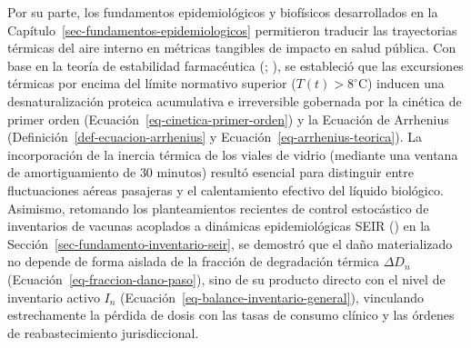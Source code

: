 \documentclass[
  spanish,
  letterpaper,
  DIV=11,
  numbers=noendperiod]{scrreprt}
\theoremstyle{plain}
\theoremstyle{plain}
\theoremstyle{plain}
\theoremstyle{definition}
\theoremstyle{remark}
\begin{document}
Por su parte, los fundamentos epidemiológicos y biofísicos desarrollados
en la Capítulo~\ref{sec-fundamentos-epidemiologicos} permitieron
traducir las trayectorias térmicas del aire interno en métricas
tangibles de impacto en salud pública. Con base en la teoría de
estabilidad farmacéutica (; ), se estableció que las excursiones térmicas por encima del
límite normativo superior (\(T(t) > 8^\circ\text{C}\)) inducen una
desnaturalización proteica acumulativa e irreversible gobernada por la
cinética de primer orden (Ecuación~\ref{eq-cinetica-primer-orden}) y la
Ecuación de Arrhenius (Definición~\ref{def-ecuacion-arrhenius} y
Ecuación~\ref{eq-arrhenius-teorica}). La incorporación de la inercia
térmica de los viales de vidrio (mediante una ventana de amortiguamiento
de \(30\text{ minutos}\)) resultó esencial para distinguir entre
fluctuaciones aéreas pasajeras y el calentamiento efectivo del líquido
biológico. Asimismo, retomando los planteamientos recientes de control
estocástico de inventarios de vacunas acoplados a dinámicas
epidemiológicas SEIR () en la Sección~\ref{sec-fundamento-inventario-seir}, se demostró
que el daño materializado no depende de forma aislada de la fracción de
degradación térmica \(\Delta D_n\)
(Ecuación~\ref{eq-fraccion-dano-paso}), sino de su producto directo con
el nivel de inventario activo \(I_n\)
(Ecuación~\ref{eq-balance-inventario-general}), vinculando estrechamente
la pérdida de dosis con las tasas de consumo clínico y las órdenes de
reabastecimiento jurisdiccional.
\end{document}
